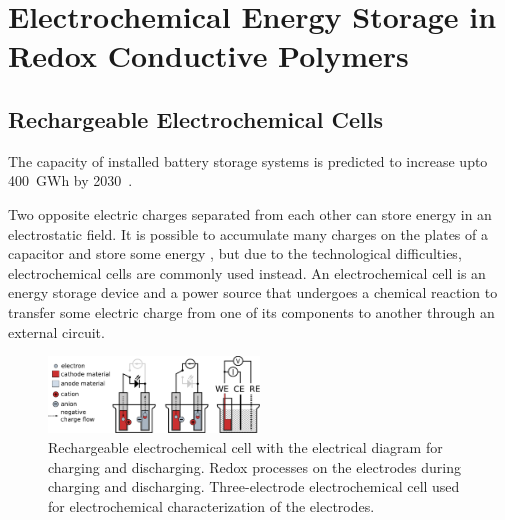 \chapter{Electrochemical Energy Storage in Redox Conductive Polymers}

\section{Rechargeable Electrochemical Cells}

The capacity of installed battery storage systems is predicted to increase upto 400~GWh by 2030~\cite{Figgener_2020}.


Two opposite electric charges separated from each other can store energy in an electrostatic field. It is possible to accumulate many charges on the plates of a capacitor and store some energy \cite{He_2022}, but due to the technological difficulties, electrochemical cells are commonly used instead. An electrochemical cell is an energy storage device and a power source that undergoes a chemical reaction to transfer some electric charge from one of its components to another through an external circuit. 

\begin{figure}[h]
\center
	\includegraphics[width=0.5\textwidth]{./electrochemistry/figures/echem_cells.pdf}
	\caption{Rechargeable electrochemical cell with the electrical diagram for charging and discharging. Redox processes on the electrodes during charging and discharging. Three-electrode electrochemical cell used for electrochemical characterization of the electrodes.}
	\label{fig:echem_cells}
\end{figure}



